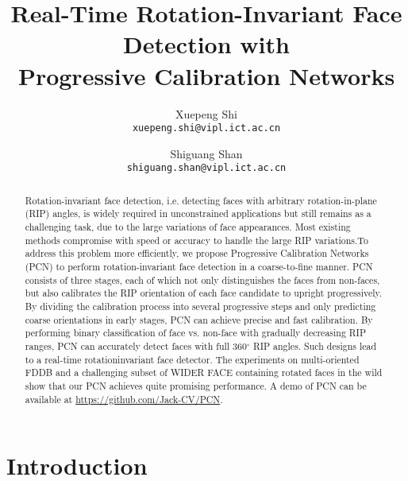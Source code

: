 \documentclass[10pt,twocolumn,letterpaper]{article}
\begin{document}
\title{Real-Time Rotation-Invariant Face Detection with\\
Progressive Calibration Networks}

\author{Xuepeng Shi\\
{\tt\small xuepeng.shi@vipl.ict.ac.cn}
\and
Shiguang Shan\\
{\tt\small shiguang.shan@vipl.ict.ac.cn}
}

\maketitle

\begin{abstract}
   Rotation-invariant face detection, i.e. detecting faces
   with arbitrary rotation-in-plane (RIP) angles, is widely required
   in unconstrained applications but still remains as a
   challenging task, due to the large variations of face appearances.
   Most existing methods compromise with speed or
   accuracy to handle the large RIP variations.To address
   this problem more efficiently, we propose Progressive Calibration
   Networks (PCN) to perform rotation-invariant face
   detection in a coarse-to-fine manner. PCN consists of three
   stages, each of which not only distinguishes the faces from
   non-faces, but also calibrates the RIP orientation of each
   face candidate to upright progressively. By dividing the
   calibration process into several progressive steps and only
   predicting coarse orientations in early stages, PCN can
   achieve precise and fast calibration. By performing binary
   classification of face vs. non-face with gradually decreasing
   RIP ranges, PCN can accurately detect faces with full
   360$^\circ$ RIP angles. Such designs lead to a real-time rotationinvariant
   face detector. The experiments on multi-oriented
   FDDB and a challenging subset of WIDER FACE containing
   rotated faces in the wild show that our PCN achieves
   quite promising performance. A demo of PCN can be available
   at \url{https://github.com/Jack-CV/PCN}.
\end{abstract}

\section{Introduction}
\end{document}
